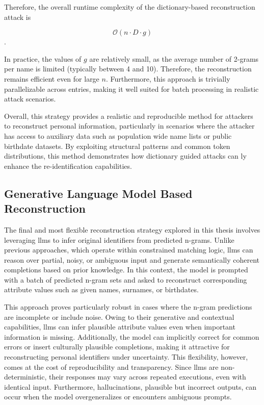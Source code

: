 Therefore, the overall runtime complexity of the dictionary-based reconstruction attack is

\[
\mathcal{O}(n \cdot D \cdot g)
\].


In practice, the values of $g$ are relatively small, as the average number of 2-grams per name is limited (typically between 4 and 10). Therefore, the reconstruction remains efficient even for large $n$. Furthermore, this approach is trivially parallelizable across entries, making it well suited for batch processing in realistic attack scenarios.


Overall, this strategy provides a realistic and reproducible method for attackers to reconstruct personal information, particularly in scenarios where the attacker has access to auxiliary data such as population wide name lists or public birthdate datasets.
By exploiting structural patterns and common token distributions, this method demonstrates how dictionary guided attacks can ly enhance the re-identification capabilities.

\subsection{Generative Language Model Based Reconstruction}
\label{sec:generative-llm-reconstruction}

The final and most flexible reconstruction strategy explored in this thesis involves leveraging \ac{llm}s to infer original identifiers from predicted n-grams.
Unlike previous approaches, which operate within constrained matching logic, \ac{llm}s can reason over partial, noisy, or ambiguous input and generate semantically coherent completions based on prior knowledge.
In this context, the model is prompted with a batch of predicted n-gram sets and asked to reconstruct corresponding attribute values such as given names, surnames, or birthdates.

This approach proves particularly robust in cases where the n-gram predictions are incomplete or include noise.
Owing to their generative and contextual capabilities, \ac{llm}s can infer plausible attribute values even when important information is missing.
Additionally, the model can implicitly correct for common errors or insert culturally plausible completions, making it attractive for reconstructing personal identifiers under uncertainty.
This flexibility, however, comes at the cost of reproducibility and transparency. Since \ac{llm}s are non-deterministic, their responses may vary across repeated executions, even with identical input.
Furthermore, hallucinations, plausible but incorrect outputs, can occur when the model overgeneralizes or encounters ambiguous prompts.

